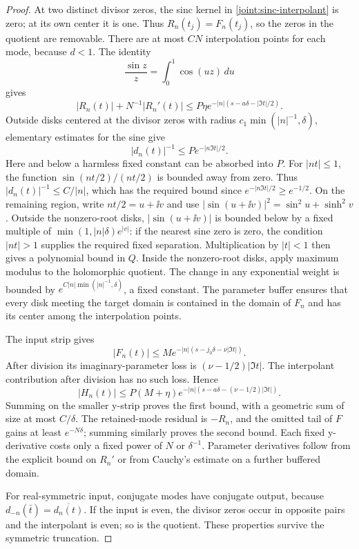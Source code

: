\begin{proof}
At two distinct divisor zeros, the sinc kernel in
\eqref{joint:sinc-interpolant} is zero; at its own center it is one.
Thus \(R_n(t_j)=F_n(t_j)\), so the zeros in the quotient are removable.
There are at most \(CN\) interpolation points for each mode, because
\(d<1\). The identity
\[
 \frac{\sin z}{z}=\int_0^1\cos(uz)\,du
\]
gives
\begin{equation}
 |R_n(t)|+N^{-1}|R_n'(t)|
 \le P\eta e^{-|n|(s-a\delta-|\Im t|/2)}.
 \label{joint:interpolant-bound}
\end{equation}
Outside disks centered at the divisor zeros with radius
\(c_1\min(|n|^{-1},\delta)\), elementary estimates for the sine give
\[
 |d_n(t)|^{-1}\le Pe^{-|n\Im t|/2}.
\]
Here and below a harmless fixed constant can be absorbed into \(P\).
For \(|nt|\le1\), the function \(\sin(nt/2)/(nt/2)\) is bounded
away from zero. Thus \(|d_n(t)|^{-1}\le C/|n|\), which has the
required bound since \(e^{-|n\Im t|/2}\ge e^{-1/2}\).
On the remaining region, write \(nt/2=u+\ii v\) and use
\(|\sin(u+\ii v)|^2=\sin^2u+\sinh^2v\). Outside the nonzero-root
disks, \(|\sin(u+\ii v)|\) is bounded below by a fixed multiple of
\(\min(1,|n|\delta)e^{|v|}\): if the nearest sine zero is zero,
the condition \(|nt|>1\) supplies the required fixed separation.
Multiplication by \(|t|<1\) then gives a polynomial bound in \(Q\).
Inside the nonzero-root disks, apply maximum modulus
to the holomorphic quotient. The change in any exponential weight is
bounded by \(e^{C|n|\min(|n|^{-1},\delta)}\), a fixed constant.
The parameter buffer ensures that every disk meeting the target domain
is contained in the domain of \(F_n\) and has its center among the
interpolation points.

The input strip gives
\[
 |F_n(t)|\le M e^{-|n|(s-j_0\delta-\nu|\Im t|)}.
\]
After division its imaginary-parameter loss is
\((\nu-1/2)|\Im t|\). The interpolant contribution after division has
no such loss. Hence
\[
 |H_n(t)|\le P(M+\eta)
 e^{-|n|(s-a\delta-(\nu-1/2)|\Im t|)}.
\]
Summing on the smaller y-strip proves the first bound, with a geometric
sum of size at most \(C/\delta\). The retained-mode residual is
\(-R_n\), and the omitted tail of \(F\) gains at least
\(e^{-N\delta}\); summing similarly proves the second bound. Each
fixed y-derivative costs only a fixed power of \(N\) or \(\delta^{-1}\).
Parameter derivatives follow from the explicit bound on \(R_n'\) or
from Cauchy's estimate on a further buffered domain.

For real-symmetric input, conjugate modes have conjugate output, because
\(d_{-n}(\bar t)=\overline{d_n(t)}\). If the input is even, the divisor
zeros occur in opposite pairs and the interpolant is even; so is the
quotient. These properties survive the symmetric truncation.
\end{proof}

